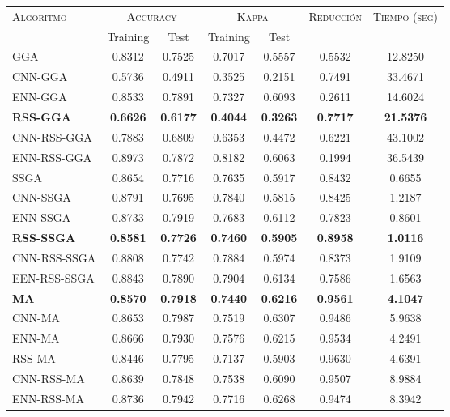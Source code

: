 \begin{table}[h!]
\centering
\begin{tabular}{l c c c c c c}
\hline
\multirow{2}{*}{\textsc{Algoritmo}}
	& \multicolumn{2}{c}{\textsc{Accuracy}}
	& \multicolumn{2}{c}{\textsc{Kappa}}
	& \textsc{Reducción}
	& \textsc{Tiempo (seg)} \\
	& Training & Test
	& Training & Test \\ 
\hline
\hline

GGA         & 0.8312 & 0.7525 & 0.7017 & 0.5557 & 0.5532 & 12.8250 \\
CNN-GGA     & 0.5736 & 0.4911 & 0.3525 & 0.2151 & 0.7491 & 33.4671 \\
ENN-GGA     & 0.8533 & 0.7891 & 0.7327 & 0.6093 & 0.2611 & 14.6024 \\
\textbf{RSS-GGA}     & \textbf{0.6626} & \textbf{0.6177} & \textbf{0.4044} & \textbf{0.3263} & \textbf{0.7717} & \textbf{21.5376} \\
CNN-RSS-GGA & 0.7883 & 0.6809 & 0.6353 & 0.4472 & 0.6221 & 43.1002 \\
ENN-RSS-GGA & 0.8973 & 0.7872 & 0.8182 & 0.6063 & 0.1994 & 36.5439 \\

\hline

SSGA & 0.8654 & 0.7716 & 0.7635 & 0.5917 & 0.8432 & 0.6655 \\
CNN-SSGA & 0.8791 & 0.7695 & 0.7840 & 0.5815 & 0.8425 & 1.2187 \\
ENN-SSGA & 0.8733 & 0.7919 & 0.7683 & 0.6112 & 0.7823 & 0.8601 \\
\textbf{RSS-SSGA} & \textbf{0.8581} & \textbf{0.7726} & \textbf{0.7460} & \textbf{0.5905} & \textbf{0.8958} &\textbf{1.0116} \\
CNN-RSS-SSGA & 0.8808 & 0.7742 & 0.7884 & 0.5974 & 0.8373 & 1.9109 \\
EEN-RSS-SSGA & 0.8843 & 0.7890 & 0.7904 & 0.6134 & 0.7586 & 1.6563 \\

\hline

\textbf{MA}   & \textbf{0.8570} & \textbf{0.7918} & \textbf{0.7440} & \textbf{0.6216} & \textbf{0.9561} & \textbf{4.1047} \\
CNN-MA & 0.8653 & 0.7987 & 0.7519 & 0.6307 & 0.9486 & 5.9638 \\
ENN-MA & 0.8666 & 0.7930 & 0.7576 & 0.6215 & 0.9534 & 4.2491 \\
RSS-MA & 0.8446 & 0.7795 & 0.7137 & 0.5903 & 0.9630 & 4.6391 \\
CNN-RSS-MA  & 0.8639 & 0.7848 & 0.7538 & 0.6090 & 0.9507 & 8.9884 \\
ENN-RSS-MA & 0.8736 & 0.7942 & 0.7716 & 0.6268 & 0.9474 & 8.3942 \\


\end{tabular}
\end{table}
